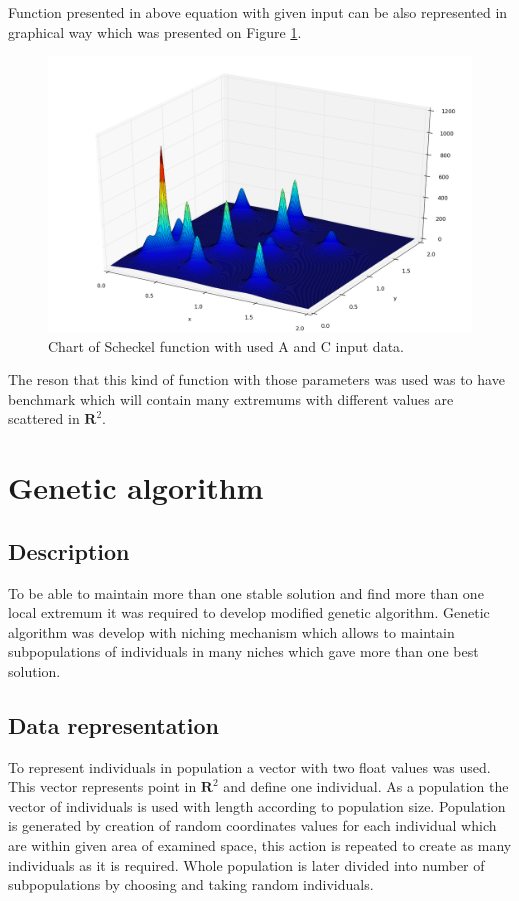 \documentclass[a4paper]{article}
\begin{document}
Function presented in above equation with given input can be also represented in graphical way which was presented on Figure \ref{sheckel}.

\begin{figure}[h!]
	\centering
	\includegraphics[scale=0.5,keepaspectratio=true]{used_function.png}	
	\caption{Chart of Scheckel function with used A and C input data.}
	\label{sheckel}
\end{figure}
The reson that this kind of function with those parameters was used was to have benchmark which will contain many extremums with different values are scattered in $\mathbf{R}^2$.
\section{Genetic algorithm}
\subsection{Description}
To be able to maintain more than one stable solution and find more than one local extremum it was required to develop modified genetic algorithm. 
Genetic algorithm was develop with niching\cite{niching1,niching2} mechanism which allows to maintain subpopulations of individuals in many niches which gave more than one best solution. 


\subsection{Data representation}
To represent individuals in population a vector with two float values was used. This vector represents point in $\mathbf{R}^2$ and define one individual. As a population the vector of individuals is 
used with length according to population size. Population is generated by creation of random coordinates values for each individual which are within given area of examined space, this action is 
repeated to create as many individuals as it is required. Whole population is later divided into number of subpopulations by choosing and taking random individuals.
\end{document}
